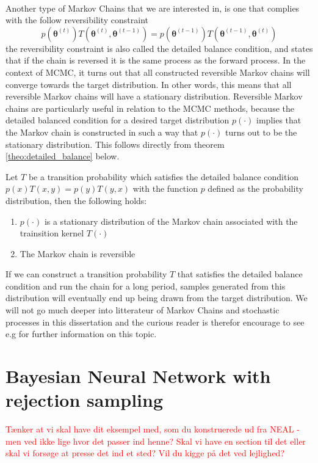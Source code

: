\\
Another type of Markov Chains that we are interested in, is one that complies with the follow reversibility constraint
\begin{equation*}
    p(\boldsymbol{\theta}^{(t)})T\left(\boldsymbol{\theta}^{(t)},\boldsymbol{\theta}^{(t-1)}\right)=p(\boldsymbol{\theta}^{(t-1)})T\left(\boldsymbol{\theta}^{(t-1)},\boldsymbol{\theta}^{(t)}\right)
\end{equation*}
the reversibility constraint is also called the detailed balance condition, and states that if the chain is reversed it is the same process as the forward process. In the context of MCMC, it turns out that all constructed reversible Markov chains will converge towards the target distribution. In other words, this means that all reversible Markov chains will have a stationary distribution. Reversible Markov chains are particularly useful in relation to the MCMC methods, because the detailed balanced condition for a desired target distribution $p(\cdot)$ implies that the Markov chain is constructed in such a way that $p(\cdot)$ turns out to be the stationary distribution. This follows directly from theorem \ref{theo:detailed_balance} below.
\begin{mytheorem}\label{theo:detailed_balance}
Let $T$ be a transition probability which satisfies the detailed balance condition $p(x)T(x, y) = p(y)T(y, x)$ with the function $p$ defined as the probability distribution, then the following holds:
\begin{enumerate}
    \item $p(\cdot)$ is a stationary distribution of the Markov chain associated with the trainsition kernel $T(\cdot)$
    \item The Markov chain is reversible
\end{enumerate}
\end{mytheorem}
If we can construct a transition probability $T$ that satisfies the detailed balance condition and run the chain for a long period, samples generated from this distribution will eventually end up being drawn from the target distribution. 
We will not go much deeper into litterateur of Markov Chains and stochastic processes in this dissertation and the curious reader is therefor encourage to see e.g \cite{lawler2006introduction} for further information on this topic. 
 
\section{Bayesian Neural Network with rejection sampling}
\textcolor{red}{Tænker at vi skal have dit eksempel med, som du konstruerede ud fra NEAL - men ved ikke lige hvor det passer ind henne? Skal vi have en section til det eller skal vi forsøge at presse det ind et sted? Vil du kigge på det ved lejlighed?}
